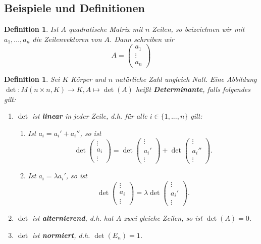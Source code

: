 \documentclass[12pt,a4paper]{article}
\theoremstyle{plain}
\newtheorem{Definition}[Theorem]{Definition}
\newcommand{\herv}[1]{{\emph{\textbf{#1}}}}
\numberwithin{equation}{section}
\begin{document}
\subsection{Beispiele und Definitionen}
\begin{Definition}
Ist $A$ quadratische Matrix mit $n$ Zeilen, so beizeichnen wir mit $a_1,...,a_n$ die Zeilenvektoren von $A$. Dann schreiben wir
\[A=\begin{pmatrix} a_1\\\vdots\\a_n\end{pmatrix}\]
\end{Definition}
\begin{Definition}
Sei $K$ Körper und $n$ natürliche Zahl ungleich Null. Eine Abbildung
$\operatorname{det}\colon M(n\times n,K)\rightarrow K, A\mapsto \operatorname{det} (A)$
heißt \herv{Determinante}, falls folgendes gilt:
\begin{enumerate}
\renewcommand{\labelenumi}{\emph{\underline{D\arabic{enumi}}}}
\item $\operatorname{det}$ ist \herv{linear} in jeder Zeile, d.h. für alle $i\in\{1,...,n\}$ gilt:\begin{enumerate}
\renewcommand{\labelenumi}{\emph{(\alph{enumi})}}
\item  Ist $a_i=a_i'+a_i''$, so ist
\[\operatorname{det}\begin{pmatrix} \vdots\\ a_i\\\vdots\end{pmatrix}=\operatorname{det}\begin{pmatrix} \vdots\\ a_i'\\\vdots\end{pmatrix}+\operatorname{det}\begin{pmatrix} \vdots\\ a_i''\\\vdots\end{pmatrix}.\]
\item  Ist $a_i=\lambda a_i'$, so ist
\[\operatorname{det}\begin{pmatrix} \vdots\\ a_i\\\vdots\end{pmatrix}=\lambda\operatorname{det}\begin{pmatrix} \vdots\\ a_i'\\\vdots\end{pmatrix}.\]
\end{enumerate}
\item $\operatorname{det}$ ist \herv{alternierend}, d.h. hat $A$ zwei gleiche Zeilen, so ist $\operatorname{det} (A)=0$.
\item $\operatorname{det}$ ist \herv{normiert}, d.h. $\operatorname{det} (E_n)=1$.
\end{enumerate}
\end{Definition}
\end{document}
